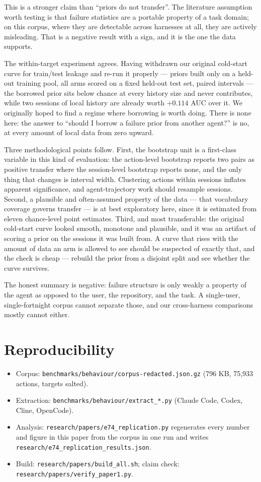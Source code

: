 \documentclass[11pt]{article}
\begin{document}
This is a stronger claim than ``priors do not transfer''. The literature
assumption worth testing is that failure statistics are a portable property
of a task domain; on this corpus, where they are detectable across harnesses
at all, they are actively misleading. That is a negative result with a
sign, and it is the one the data supports.

The within-target experiment agrees. Having withdrawn our original cold-start
curve for train/test leakage and re-run it properly --- priors built only on
a held-out training pool, all arms scored on a fixed held-out test set,
paired intervals --- the borrowed prior sits below chance at every history
size and never contributes, while two sessions of local history are already
worth $+0.114$ AUC over it. We originally hoped to find a regime where
borrowing is worth doing. There is none here: the answer to ``should I
borrow a failure prior from another agent?'' is no, at every amount of local
data from zero upward.

Three methodological points follow. First, the bootstrap unit is a
first-class variable in this kind of evaluation: the action-level bootstrap
reports two pairs as positive transfer where the session-level bootstrap
reports none, and the only thing that changes is interval width. Clustering
actions within sessions inflates apparent significance, and
agent-trajectory work should resample sessions. Second, a plausible and
often-assumed property of the data --- that vocabulary coverage governs
transfer --- is at best exploratory here, since it is estimated from
eleven chance-level point estimates. Third, and most transferable: the
original cold-start curve looked smooth, monotone and plausible, and it was
an artifact of scoring a prior on the sessions it was built from. A curve
that rises with the amount of data an arm is allowed to see should be
suspected of exactly that, and the check is cheap --- rebuild the prior from
a disjoint split and see whether the curve survives.

The honest summary is negative: failure structure is only weakly a
property of the agent as opposed to the user, the repository, and the task.
A single-user, single-fortnight corpus cannot separate those, and our
cross-harness comparisons mostly cannot either.

\section*{Reproducibility}

\begin{itemize}
\item Corpus: \texttt{benchmarks/behaviour/corpus-redacted.json.gz}
  (796 KB, 75,933 actions, targets salted).
\item Extraction: \texttt{benchmarks/behaviour/extract\_*.py}
  (Claude Code, Codex, Cline, OpenCode).
\item Analysis: \texttt{research/papers/e74\_replication.py} regenerates
  every number and figure in this paper from the corpus in one run and
  writes \texttt{research/e74\_replication\_results.json}.
\item Build: \texttt{research/papers/build\_all.sh}; claim check:
  \texttt{research/papers/verify\_paper1.py}.
\end{itemize}
\end{document}
